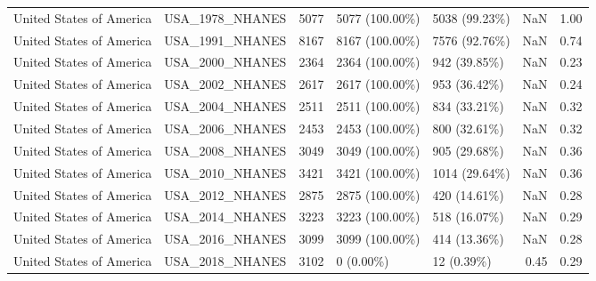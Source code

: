 \begin{longtable}{llrllrr}
\addlinespace
United States of America & USA\_1978\_NHANES & 5077 & 5077 (100.00\%) & 5038 (99.23\%) & NaN & 1.00\\
United States of America & USA\_1991\_NHANES & 8167 & 8167 (100.00\%) & 7576 (92.76\%) & NaN & 0.74\\
United States of America & USA\_2000\_NHANES & 2364 & 2364 (100.00\%) & 942 (39.85\%) & NaN & 0.23\\
United States of America & USA\_2002\_NHANES & 2617 & 2617 (100.00\%) & 953 (36.42\%) & NaN & 0.24\\
United States of America & USA\_2004\_NHANES & 2511 & 2511 (100.00\%) & 834 (33.21\%) & NaN & 0.32\\
United States of America & USA\_2006\_NHANES & 2453 & 2453 (100.00\%) & 800 (32.61\%) & NaN & 0.32\\
United States of America & USA\_2008\_NHANES & 3049 & 3049 (100.00\%) & 905 (29.68\%) & NaN & 0.36\\
United States of America & USA\_2010\_NHANES & 3421 & 3421 (100.00\%) & 1014 (29.64\%) & NaN & 0.36\\
United States of America & USA\_2012\_NHANES & 2875 & 2875 (100.00\%) & 420 (14.61\%) & NaN & 0.28\\
United States of America & USA\_2014\_NHANES & 3223 & 3223 (100.00\%) & 518 (16.07\%) & NaN & 0.29\\
United States of America & USA\_2016\_NHANES & 3099 & 3099 (100.00\%) & 414 (13.36\%) & NaN & 0.28\\
United States of America & USA\_2018\_NHANES & 3102 & 0 (0.00\%) & 12 (0.39\%) & 0.45 & 0.29\\*
\end{longtable}
\endgroup{}

